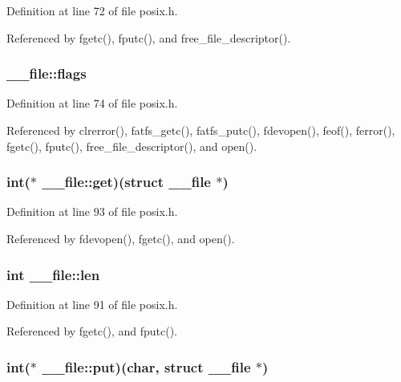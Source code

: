 Definition at line 72 of file posix.\-h.



Referenced by fgetc(), fputc(), and free\-\_\-file\-\_\-descriptor().

\hypertarget{struct____file_a8d11df8679502efee09740f97d7c277b}{
\subsubsection[{flags}]{ \-\_\-\-\_\-file\-::flags}}\label{struct____file_a8d11df8679502efee09740f97d7c277b}


Definition at line 74 of file posix.\-h.



Referenced by clrerror(), fatfs\-\_\-getc(), fatfs\-\_\-putc(), fdevopen(), feof(), ferror(), fgetc(), fputc(), free\-\_\-file\-\_\-descriptor(), and open().

\hypertarget{struct____file_a467262b28adfee5f6fb6df42de293071}{
\subsubsection[{get}]{\setlength{\rightskip}{0pt plus 5cm}int($\ast$ \-\_\-\-\_\-file\-::get)(struct {\bf \-\_\-\-\_\-file} $\ast$)}}\label{struct____file_a467262b28adfee5f6fb6df42de293071}


Definition at line 93 of file posix.\-h.



Referenced by fdevopen(), fgetc(), and open().

\hypertarget{struct____file_a30309efd13a75ed510bb2370debafaf8}{
\subsubsection[{len}]{\setlength{\rightskip}{0pt plus 5cm}int \-\_\-\-\_\-file\-::len}}\label{struct____file_a30309efd13a75ed510bb2370debafaf8}


Definition at line 91 of file posix.\-h.



Referenced by fgetc(), and fputc().

\hypertarget{struct____file_ac30baaec720d36ed503f35ae50bcec13}{
\subsubsection[{put}]{\setlength{\rightskip}{0pt plus 5cm}int($\ast$ \-\_\-\-\_\-file\-::put)(char, struct {\bf \-\_\-\-\_\-file} $\ast$)}}\label{struct____file_ac30baaec720d36ed503f35ae50bcec13}


